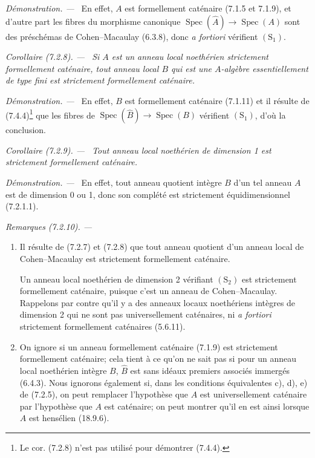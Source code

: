\documentclass[10pt,oneside]{book}
\makeatletter
\newenvironment{corollary}[1][]{%
  \par\medskip\noindent\itshape Corollaire (#1). ---\ }{\par}
\newenvironment{remarks}[1][]{%
  \par\medskip\noindent\itshape Remarques (#1). ---\ }{\par}
\newenvironment{proof}{%
  \par\medskip\noindent\textit{Démonstration. ---\ }}{\par}
\newcommand{\EGAReaderTarget}[2]{\hypertarget{#1}{}\@bsphack\begingroup\def\@currentHref{#1}\label{#2}\endgroup\@esphack}
\makeatother
\begin{document}
\begin{proof}
En effet, $A$ est formellement caténaire (7.1.5 et 7.1.9), et d'autre part
les fibres du morphisme canonique
$\operatorname{Spec}(\widehat A)\to\operatorname{Spec}(A)$ sont des
préschémas de Cohen--Macaulay (6.3.8), donc \emph{a fortiori} vérifient
$(\mathrm S_1)$.
\end{proof}

\begin{corollary}[7.2.8]
\label{IV.2.s7.2.8-fr}
Si $A$ est un anneau local noethérien strictement formellement caténaire,
tout anneau local $B$ qui est une $A$-algèbre essentiellement de type fini
est strictement formellement caténaire.
\end{corollary}

\begin{proof}
En effet, $B$ est formellement caténaire (7.1.11) et il résulte de
(7.4.4)\footnote{Le cor. (7.2.8) n'est pas utilisé pour démontrer (7.4.4).}
que les fibres de
$\operatorname{Spec}(\widehat B)\to\operatorname{Spec}(B)$ vérifient
$(\mathrm S_1)$, d'où la conclusion.
\end{proof}

\begin{corollary}[7.2.9]
\EGAReaderTarget{ega4.c04.cor.7-2-9}{IV.2.s7.2.9-fr}
Tout anneau local noethérien de dimension 1 est strictement formellement
caténaire.
\end{corollary}

\begin{proof}
En effet, tout anneau quotient intègre $B$ d'un tel anneau $A$ est de
dimension 0 ou 1, donc son complété est strictement équidimensionnel
(7.2.1.1).
\end{proof}

\begin{remarks}[7.2.10]
\label{IV.2.s7.2.10-fr}
\begin{enumerate}
\item[(i)] Il résulte de (7.2.7) et (7.2.8) que tout anneau quotient d'un
anneau local de Cohen--Macaulay est strictement formellement caténaire.

Un anneau local noethérien de dimension 2 vérifiant $(\mathrm S_2)$ est
strictement formellement caténaire, puisque c'est un anneau de
Cohen--Macaulay. Rappelons par contre qu'il y a des anneaux locaux
noethériens intègres de dimension 2 qui ne sont pas universellement
caténaires, ni \emph{a fortiori} strictement formellement caténaires
(5.6.11).
\item[(ii)] On ignore si un anneau formellement caténaire (7.1.9) est
strictement formellement caténaire; cela tient à ce qu'on ne sait pas si
pour un anneau local noethérien intègre $B$, $\widehat B$ est sans idéaux
premiers associés immergés (6.4.3). Nous ignorons également si, dans les
conditions équivalentes c), d), e) de (7.2.5), on peut remplacer
l'hypothèse que $A$ est universellement caténaire par l'hypothèse que $A$
est caténaire; on peut montrer qu'il en est ainsi lorsque $A$ est hensélien
(18.9.6).
\end{enumerate}
\end{remarks}
\end{document}
